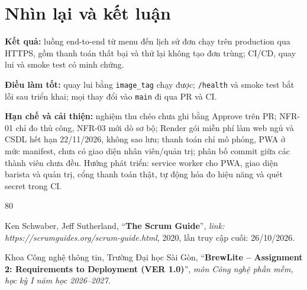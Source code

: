 \documentclass[a4paper]{article}
\begin{document}
\section{Nhìn lại và kết luận}
\textbf{Kết quả:} luồng end-to-end từ menu đến lịch sử đơn chạy trên production qua HTTPS, gồm thanh toán thất bại và thử lại không tạo đơn trùng; CI/CD, quay lui và smoke test có minh chứng.

\textbf{Điều làm tốt:} quay lui bằng \texttt{image\_tag} chạy được; \texttt{/health} và smoke test bắt lỗi sau triển khai; mọi thay đổi vào \texttt{main} đi qua PR và CI.

\textbf{Hạn chế và cải thiện:} nghiệm thu chéo chưa ghi bằng Approve trên PR; NFR-01 chỉ đo thủ công, NFR-03 mới dò sơ bộ; Render gói miễn phí làm web ngủ và CSDL hết hạn 22/11/2026, không sao lưu; thanh toán chỉ mô phỏng, PWA ở mức manifest, chưa có giao diện nhân viên/quản trị; phân bố commit giữa các thành viên chưa đều. Hướng phát triển: service worker cho PWA, giao diện barista và quản trị, cổng thanh toán thật, tự động hóa đo hiệu năng và quét secret trong CI.

\begin{thebibliography}{80}

Ken Schwaber, Jeff Sutherland,
``\textbf{The Scrum Guide}'',
\textit{link: https://scrumguides.org/scrum-guide.html}, 2020, lần truy cập cuối: 26/10/2026.

Khoa Công nghệ thông tin, Trường Đại học Sài Gòn,
``\textbf{BrewLite -- Assignment 2: Requirements to Deployment (VER 1.0)}'',
\textit{môn Công nghệ phần mềm, học kỳ I năm học 2026--2027}.

\end{thebibliography}
\end{document}

